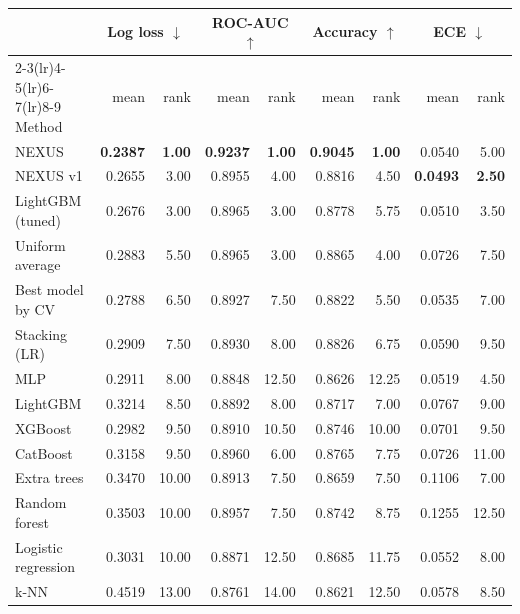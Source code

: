 \begin{tabular}{lrrrrrrrr}
\toprule
& \multicolumn{2}{c}{Log loss $\downarrow$} & \multicolumn{2}{c}{ROC-AUC $\uparrow$} & \multicolumn{2}{c}{Accuracy $\uparrow$} & \multicolumn{2}{c}{ECE $\downarrow$}\\
\cmidrule(lr){2-3}\cmidrule(lr){4-5}\cmidrule(lr){6-7}\cmidrule(lr){8-9}
Method & mean & rank & mean & rank & mean & rank & mean & rank\\
\midrule
NEXUS & \textbf{0.2387} & \textbf{1.00} & \textbf{0.9237} & \textbf{1.00} & \textbf{0.9045} & \textbf{1.00} & 0.0540 & 5.00\\
NEXUS v1 & 0.2655 & 3.00 & 0.8955 & 4.00 & 0.8816 & 4.50 & \textbf{0.0493} & \textbf{2.50}\\
LightGBM (tuned) & 0.2676 & 3.00 & 0.8965 & 3.00 & 0.8778 & 5.75 & 0.0510 & 3.50\\
Uniform average & 0.2883 & 5.50 & 0.8965 & 3.00 & 0.8865 & 4.00 & 0.0726 & 7.50\\
Best model by CV & 0.2788 & 6.50 & 0.8927 & 7.50 & 0.8822 & 5.50 & 0.0535 & 7.00\\
Stacking (LR) & 0.2909 & 7.50 & 0.8930 & 8.00 & 0.8826 & 6.75 & 0.0590 & 9.50\\
MLP & 0.2911 & 8.00 & 0.8848 & 12.50 & 0.8626 & 12.25 & 0.0519 & 4.50\\
LightGBM & 0.3214 & 8.50 & 0.8892 & 8.00 & 0.8717 & 7.00 & 0.0767 & 9.00\\
XGBoost & 0.2982 & 9.50 & 0.8910 & 10.50 & 0.8746 & 10.00 & 0.0701 & 9.50\\
CatBoost & 0.3158 & 9.50 & 0.8960 & 6.00 & 0.8765 & 7.75 & 0.0726 & 11.00\\
Extra trees & 0.3470 & 10.00 & 0.8913 & 7.50 & 0.8659 & 7.50 & 0.1106 & 7.00\\
Random forest & 0.3503 & 10.00 & 0.8957 & 7.50 & 0.8742 & 8.75 & 0.1255 & 12.50\\
Logistic regression & 0.3031 & 10.00 & 0.8871 & 12.50 & 0.8685 & 11.75 & 0.0552 & 8.00\\
k-NN & 0.4519 & 13.00 & 0.8761 & 14.00 & 0.8621 & 12.50 & 0.0578 & 8.50\\
\bottomrule
\end{tabular}
